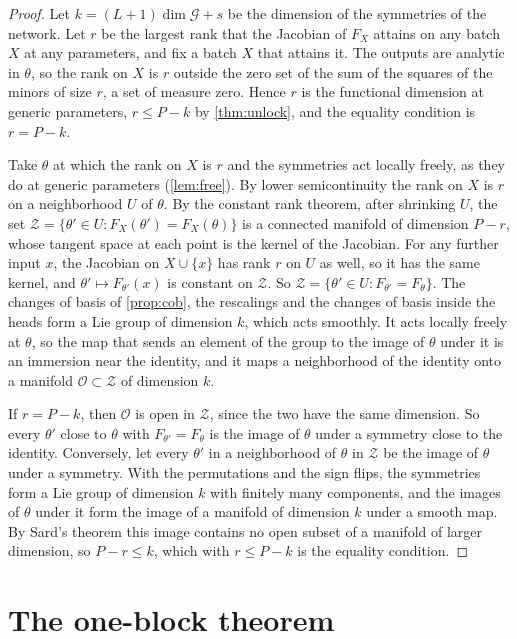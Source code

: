 \documentclass[10pt]{article}
\theoremstyle{definition}
\theoremstyle{remark}
\newcommand{\G}{\mathcal{G}}
\begin{document}
\begin{proof}
Let $k = (L+1)\dim\G + s$ be the dimension of the symmetries of the network. Let $r$ be the largest rank that the Jacobian of $F_X$ attains on any batch $X$ at any parameters, and fix a batch $X$ that attains it. The outputs are analytic in $\theta$, so the rank on $X$ is $r$ outside the zero set of the sum of the squares of the minors of size $r$, a set of measure zero. Hence $r$ is the functional dimension at generic parameters, $r \le P - k$ by \cref{thm:unlock}, and the equality condition is $r = P - k$.

Take $\theta$ at which the rank on $X$ is $r$ and the symmetries act locally freely, as they do at generic parameters (\cref{lem:free}). By lower semicontinuity the rank on $X$ is $r$ on a neighborhood $U$ of $\theta$. By the constant rank theorem, after shrinking $U$, the set $\mathcal Z = \{\theta' \in U : F_X(\theta') = F_X(\theta)\}$ is a connected manifold of dimension $P - r$, whose tangent space at each point is the kernel of the Jacobian. For any further input $x$, the Jacobian on $X \cup \{x\}$ has rank $r$ on $U$ as well, so it has the same kernel, and $\theta' \mapsto F_{\theta'}(x)$ is constant on $\mathcal Z$. So $\mathcal Z = \{\theta' \in U : F_{\theta'} = F_\theta\}$. The changes of basis of \cref{prop:cob}, the rescalings and the changes of basis inside the heads form a Lie group of dimension $k$, which acts smoothly. It acts locally freely at $\theta$, so the map that sends an element of the group to the image of $\theta$ under it is an immersion near the identity, and it maps a neighborhood of the identity onto a manifold $\mathcal O \subset \mathcal Z$ of dimension $k$.

If $r = P - k$, then $\mathcal O$ is open in $\mathcal Z$, since the two have the same dimension. So every $\theta'$ close to $\theta$ with $F_{\theta'} = F_\theta$ is the image of $\theta$ under a symmetry close to the identity. Conversely, let every $\theta'$ in a neighborhood of $\theta$ in $\mathcal Z$ be the image of $\theta$ under a symmetry. With the permutations and the sign flips, the symmetries form a Lie group of dimension $k$ with finitely many components, and the images of $\theta$ under it form the image of a manifold of dimension $k$ under a smooth map. By Sard's theorem this image contains no open subset of a manifold of larger dimension, so $P - r \le k$, which with $r \le P - k$ is the equality condition.
\end{proof}

\section{The one-block theorem}\label{app:onelayer}
\end{document}

